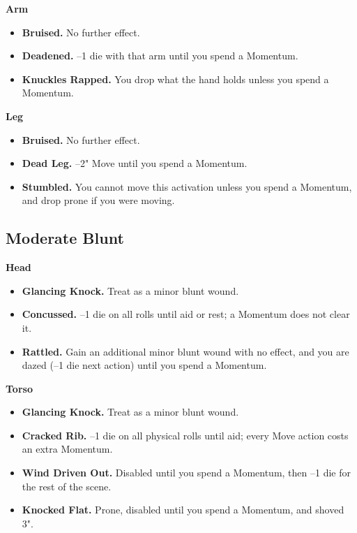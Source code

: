 \textbf{Arm}
\begin{itemize}
    \item[1--2] \textbf{Bruised.} No further effect.
    \item[3] \textbf{Deadened.} --1 die with that arm until you spend a Momentum.
    \item[4] \textbf{Knuckles Rapped.} You drop what the hand holds unless you spend a Momentum.
\end{itemize}

\textbf{Leg}
\begin{itemize}
    \item[1--2] \textbf{Bruised.} No further effect.
    \item[3] \textbf{Dead Leg.} --2" Move until you spend a Momentum.
    \item[4] \textbf{Stumbled.} You cannot move this activation unless you spend a Momentum, and drop prone if you were moving.
\end{itemize}

\subsection{Moderate Blunt}

\textbf{Head}
\begin{itemize}
    \item[1] \textbf{Glancing Knock.} Treat as a minor blunt wound.
    \item[2] \textbf{Concussed.} --1 die on all rolls until aid or rest; a Momentum does not clear it.
    \item[3--4] \textbf{Rattled.} Gain an additional minor blunt wound with no effect, and you are dazed (--1 die next action) until you spend a Momentum.
\end{itemize}

\textbf{Torso}
\begin{itemize}
    \item[1] \textbf{Glancing Knock.} Treat as a minor blunt wound.
    \item[2] \textbf{Cracked Rib.} --1 die on all physical rolls until aid; every Move action costs an extra Momentum.
    \item[3] \textbf{Wind Driven Out.} Disabled until you spend a Momentum, then --1 die for the rest of the scene.
    \item[4] \textbf{Knocked Flat.} Prone, disabled until you spend a Momentum, and shoved 3".
\end{itemize}

